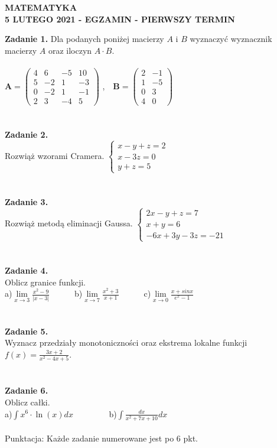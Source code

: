 \documentclass[12pt,a4paper]{report}
\begin{document}
\begin{center}

\textbf{MATEMATYKA \\5 LUTEGO 2021 - EGZAMIN - PIERWSZY TERMIN}

\end{center}\textbf{Zadanie 1.} Dla podanych poniżej macierzy $A$ i $B$ wyznaczyć wyznacznik macierzy $A$ oraz iloczyn $A\cdot B$. \\\\ $ \mathbf{A} = \left( \begin{array}{cccc} 4 & 6& -5 & 10\\5 & -2& 1 & -3\\0 & -2& 1 & -1\\2 & 3 & -4 & 5 \end{array} \right)$ ,\ \ $\mathbf{B} =\left( \begin{array}{cccc}2 & -1\\1 & -5\\0 & 3\\4 & 0  \end{array} \right)$\\\\\\\textbf{Zadanie 2.}  \\Rozwiąż wzorami Cramera. $\left\{ \begin{array}{ll}x-y+z=2\\x-3z=0\\y+z=5\end{array}\right.$\\\\\\\textbf{Zadanie 3.} \\Rozwiąż metodą eliminacji Gaussa. $\left\{ \begin{array}{ll}2x-y+z=7\\x+y=6\\-6x+3y-3z=-21\end{array} \right.$\\\\\\\textbf{Zadanie 4.} \\Oblicz granice funkcji.\\a)$\lim\limits_{x\to 3}\frac{x^2-9}{\vert x-3\vert}$\ \ \ \ \ \  b)$\lim\limits_{x\to 7}\frac{x^2+3}{x+1}$\ \ \ \ \ \ c)$\lim\limits_{x\to 0} \frac{x+sinx}{e^x-1}$\\\\\\\textbf{Zadanie 5.} \\Wyznacz przedziały monotoniczności oraz ekstrema lokalne funkcji $f(x)=\frac{3x+2}{x^2-4x+5}$.\\\\\\\textbf{Zadanie 6.}\\Oblicz całki. \\a)$\int x^6\cdot \ln(x) dx$ \ \ \ \ \ \ \ \ b)$\int \frac{dx}{x^2+7x+10} dx$\\\\Punktacja: Każde zadanie numerowane jest po 6 pkt.
\end{document}
